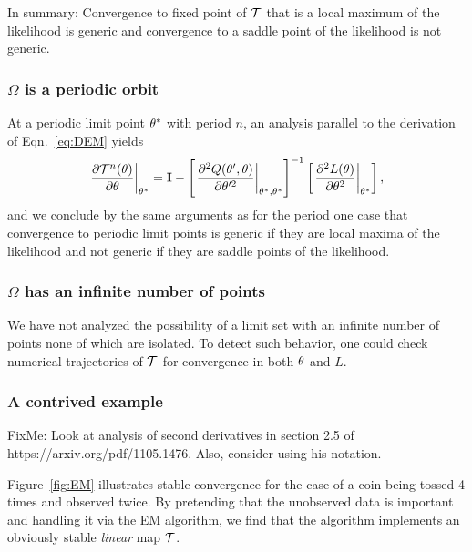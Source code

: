 In summary: Convergence to fixed point of $\EMmap$ that is a local
maximum of the likelihood is generic and convergence to a saddle point
of the likelihood is not generic.

\subsubsection{$\Omega $ is a periodic orbit}
\label{sec:EMperiodic}

At a periodic limit point $\theta^*$ with period $n$, an analysis
parallel to the derivation of Eqn.~\eqref{eq:DEM} yields
\begin{equation*}
  \label{eq:DEM-periodic}
  \left. \frac{\partial \EMmap^n(\parameters)}{\partial \parameters}
  \right|_{\parameters^*} = \id -
  \left[ \left. \frac{\partial^2 Q(\parameters',\parameters)}{\partial
        \parameters'^2} \right|_{\parameters^*,\parameters^*} \right]^{-1}
  \left[ \left. \frac{\partial^2 L(\parameters)}{\partial
        \parameters^2} \right|_{\parameters^*} \right],
\end{equation*}
and we conclude by the same arguments as for the period one case that
convergence to periodic limit points is generic if they are local
maxima of the likelihood and not generic if they are saddle points of
the likelihood.

\subsubsection{$\Omega $  has an infinite number of points}
\label{sec:EMstrange}

We have not analyzed the possibility of a limit set with an infinite
number of points none of which are isolated.  To detect such behavior,
one could check numerical trajectories of $\EMmap$ for convergence in
both $\theta$ and $L$.

\subsubsection{A contrived example}
\label{sec:contrived}

FixMe: Look at analysis of second derivatives in section 2.5 of
https://arxiv.org/pdf/1105.1476.  Also, consider using his notation.

Figure~\ref{fig:EM} illustrates stable convergence for the case of a
coin being tossed 4 times and observed twice.  By pretending that the
unobserved data is important and handling it via the EM algorithm, we
find that the algorithm implements an obviously stable \emph{linear}
map $\EMmap$.

